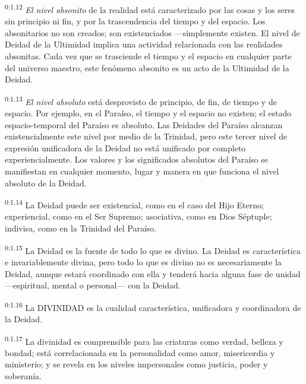 \par
\textsuperscript{0:1.12} \textit{El nivel absonito} de la realidad está caracterizado por las cosas y los seres sin principio ni fin, y por la trascendencia del tiempo y del espacio. Los absonitarios no son creados; son existenciados ---simplemente existen. El nivel de Deidad de la Ultimidad implica una actividad relacionada con las realidades absonitas. Cada vez que se trasciende el tiempo y el espacio en cualquier parte del universo maestro, este fenómeno absonito es un acto de la Ultimidad de la Deidad.

\par
\textsuperscript{0:1.13} \textit{El nivel absoluto} está desprovisto de principio, de fin, de tiempo y de espacio. Por ejemplo, en el Paraíso, el tiempo y el espacio no existen; el estado espacio-temporal del Paraíso es absoluto. Las Deidades del Paraíso alcanzan existencialmente este nivel por medio de la Trinidad, pero este tercer nivel de expresión unificadora de la Deidad no está unificado por completo experiencialmente. Los valores y los significados absolutos del Paraíso se manifiestan en cualquier momento, lugar y manera en que funciona el nivel absoluto de la Deidad.

\par
\textsuperscript{0:1.14} La Deidad puede ser existencial, como en el caso del Hijo Eterno; experiencial, como en el Ser Supremo; asociativa, como en Dios Séptuple; indivisa, como en la Trinidad del Paraíso.

\par
\textsuperscript{0:1.15} La Deidad es la fuente de todo lo que es divino. La Deidad es característica e invariablemente divina, pero todo lo que es divino no es necesariamente la Deidad, aunque estará coordinado con ella y tenderá hacia alguna fase de unidad ---espiritual, mental o personal--- con la Deidad.

\par
\textsuperscript{0:1.16} La DIVINIDAD es la cualidad característica, unificadora y coordinadora de la Deidad.

\par
\textsuperscript{0:1.17} La divinidad es comprensible para las criaturas como verdad, belleza y bondad; está correlacionada en la personalidad como amor, misericordia y ministerio; y se revela en los niveles impersonales como justicia, poder y soberanía.


